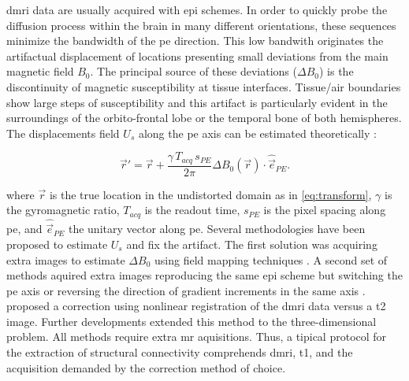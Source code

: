 \Gls*{dmri} data are usually acquired with \gls*{epi} schemes.
In order to quickly probe the diffusion process within the brain in many different orientations,
  these sequences minimize the bandwidth of the \gls*{pe} direction.
This low bandwith originates the artifactual displacement of locations presenting small deviations
  from the main magnetic field $B_0$.
The principal source of these deviations ($\Delta B_0$) is the discontinuity of magnetic
  susceptibility at tissue interfaces.
Tissue/air boundaries show large steps of susceptibility and this artifact is
  particularly evident in the surroundings of the orbito-frontal lobe or the temporal
  bone of both hemispheres.
The displacements field $U_s$ along the \gls*{pe} axis can be estimated theoretically
  \citep{jezzard_correction_1995}:

  \begin{equation}
  \vec{r}' = \vec{r} + \frac{\gamma \, T_{acq}\, s_{PE}}{2\pi}\Delta B_0(\vec{r}) \cdot \hat{\vec{e}}_{PE}.
  \label{eq:fieldmap}
  \end{equation}

where $\vec{r}$ is the true location in the undistorted domain as in \eqref{eq:transform},
  $\gamma$ is the gyromagnetic ratio, $T_{acq}$ is the readout time,
  $s_{PE}$ is the pixel spacing along \gls*{pe}, and $\hat{\vec{e}}_{PE}$ the unitary
  vector along \gls*{pe}.
Several methodologies have been proposed to estimate $U_s$ and fix the artifact.
The first solution was acquiring extra images to estimate $\Delta B_0$ using field mapping
  techniques \citep{jezzard_correction_1995,andersson_modeling_2001}.
A second set of methods aquired extra images reproducing the same \gls*{epi} scheme but switching
  the \gls*{pe} axis \citep{chiou_simple_2000} or reversing the direction of gradient
  increments in the same axis \citep{cordes_geometric_2000,holland_efficient_2010}.
\cite{kybic_unwarping_2000} proposed a correction using nonlinear registration of the \gls*{dmri}
  data versus a \gls*{t2} image.
Further developments \citep{irfanoglu_susceptibility_2011} extended this method to the
  three-dimensional problem.
All methods require extra \gls*{mr} aquisitions. Thus, a tipical protocol for the extraction
  of structural connectivity comprehends \gls*{dmri}, \gls*{t1}, and the acquisition demanded
  by the correction method of choice.

